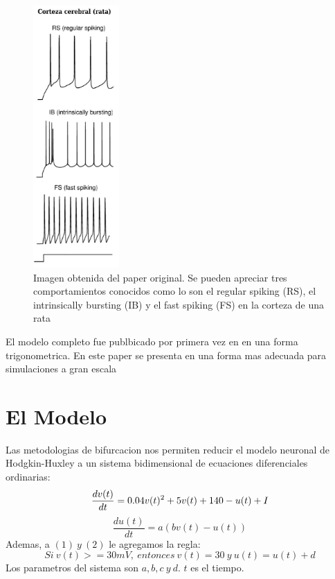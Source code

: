 \documentclass[12pt]{article}
\begin{document}
\begin{figure}
    \centering
        \includegraphics[height=10cm]{images/rata.jpg}
    \caption[fontsize=2pt]{Imagen obtenida del paper original. Se pueden apreciar tres comportamientos conocidos como lo son el regular spiking (RS), el intrinsically bursting (IB) y el fast spiking (FS) en la corteza de una rata}
\end{figure}

El modelo completo fue publbicado por primera vez en \cite{modeloPrimero} en una forma trigonometrica. En este paper se presenta en una forma mas adecuada para simulaciones a gran escala

\section{El Modelo}
Las metodologias de bifurcacion \cite{bifurcacion} nos permiten reducir el modelo neuronal de Hodgkin-Huxley a un sistema bidimensional de ecuaciones diferenciales ordinarias:
\begin{equation}
    \frac{dv(t)}{dt} = 0.04 v(t)^2 + 5 v(t) + 140 - u(t) + I\\
\end{equation}
\begin{equation}
    \frac{du(t)}{dt} = a(b v(t) - u(t))
\end{equation}
Ademas, a $(1) \ y  \ (2)$ le agregamos la regla:
\begin{equation}
    Si \ v(t) >= 30 mV,\ entonces \
        v(t) = 30 \ y \ u(t) = u(t) + d
\end{equation}
Los parametros del sistema son $a, b, c \ y \ d$. $t$ es el tiempo. \\ \\
\end{document}
